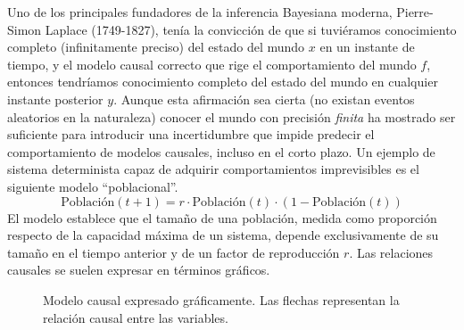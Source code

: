 \documentclass[a4paper,10pt]{book}
\theoremstyle{definition}
\begin{document}
Uno de los principales fundadores de la inferencia Bayesiana moderna, Pierre-Simon Laplace (1749-1827), ten\'ia la convicci\'on de que si tuviéramos conocimiento completo (infinitamente preciso) del estado del mundo $x$ en un instante de tiempo, y el modelo causal correcto que rige el comportamiento del mundo $f$, entonces tendr\'iamos conocimiento completo del estado del mundo en cualquier instante posterior $y$.
%
Aunque esta afirmaci\'on sea cierta (no existan eventos aleatorios en la naturaleza) conocer el mundo con precisi\'on \emph{finita} ha mostrado ser suficiente para introducir una incertidumbre que impide predecir el comportamiento de modelos causales, incluso en el corto plazo.
%
Un ejemplo de sistema determinista capaz de adquirir comportamientos imprevisibles es el siguiente modelo ``poblacional''.
%
\begin{equation}
 \text{Poblaci\'on}(t+1) = r \cdot \text{Poblaci\'on}(t)\cdot (1-\text{Poblaci\'on}(t))
\end{equation}
%
El modelo establece que el tama\~no de una poblaci\'on, medida como proporci\'on respecto de la capacidad m\'axima de un sistema, depende exclusivamente de su tama\~no en el tiempo anterior y de un factor de reproducci\'on $r$.
%
Las relaciones causales se suelen expresar en t\'erminos gr\'aficos.


\begin{figure}[ht!]
\centering
{}
\caption{Modelo causal expresado gr\'aficamente. Las flechas representan la relaci\'on causal entre las variables. }
\label{fig:modelo_poblacional}
\end{figure}

\end{document}

